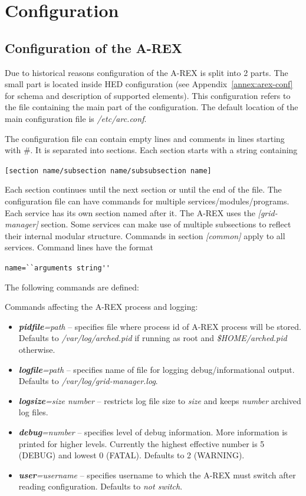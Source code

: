 \documentclass{article}                            %
\begin{document}
\section{Configuration}

\subsection{Configuration of the A-REX\label{SubSection:ConfigFile}}

Due to historical reasons configuration of the A-REX is split into 2
parts. The small part is located inside HED configuration (see
Appendix~\ref{annex:arex-conf} for schema and description of supported
elements). This configuration refers to the file containing the main
part of the configuration. The default location of the main
configuration file is \textit{/etc/arc.conf}.

The configuration file can contain empty lines and comments in lines
starting with \#. It is separated into sections. Each section starts
with a string containing

\begin{shaded}
\verb|[section name/subsection name/subsubsection name]|
\end{shaded}

Each section continues until the next section or until the end of the
file. The configuration file can have commands for multiple
services/modules/programs. Each service has its own section named
after it. The A-REX uses the \emph{{[}grid-manager]} section. Some
services can make use of multiple subsections to reflect their
internal modular structure. Commands in section \emph{{[}common]}
apply to all services. Command lines have the format

\begin{shaded}
\verb|name=``arguments string''|
\end{shaded}
The following commands are defined:

Commands affecting the A-REX process and logging:

\begin{itemize}
\item \textbf{\textit{pidfile}}\textit{=path} -- specifies file where
  process id of A-REX process will be stored. Defaults to
  \emph{/var/log/arched.pid} if running as root and
  \emph{\$HOME/arched.pid} otherwise.
\item \textbf{\textit{logfile}}\textit{=path} -- specifies name of file
  for logging debug/informational output. Defaults to
  \emph{/var/log/grid-manager.log}.
\item \textbf{\textit{logsize}}\textit{=size number} -- restricts
  log file size to \emph{size} and keeps \emph{number} archived log
  files.
\item \textbf{\textit{debug}}\textit{=number} -- specifies level of
  debug information. More information is printed for higher
  levels. Currently the highest effective number is 5 (DEBUG) and
  lowest 0 (FATAL). Defaults to 2 (WARNING).
\item \textbf{\textit{user}}\textit{=username} -- specifies username to
  which the A-REX must switch after reading configuration. Defaults to
  \emph{not switch}.
\end{itemize}
\end{document}
